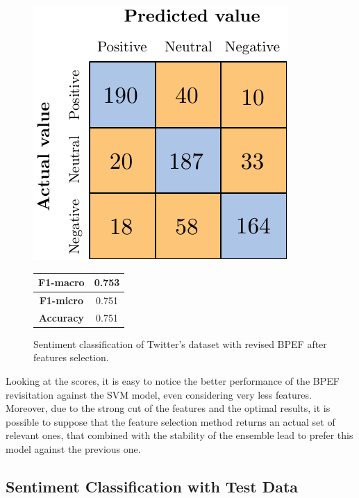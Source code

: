 \begin{figure}[H]
	\begin{minipage}[b]{0.6\linewidth}
		\centering
		\includegraphics[scale=1]{figures/conf_matrices/twitter_snt_bpef/twitter_snt_bpef_afs.pdf}
	\end{minipage}
	\begin{minipage}[b]{0.3\linewidth}
		\begin{tabular}[b]{ | c | c | } 
			\hline
			\textbf{F1-macro} & 0.753 \\
			\hline
			\textbf{F1-micro} & 0.751 \\ 
			\hline
			\textbf{Accuracy} & 0.751 \\ 
			\hline
		\end{tabular}
	\end{minipage}
	\caption{Sentiment classification of Twitter's dataset with revised BPEF after features selection.}
	\label{fig:tw_snt_bpef_afs}
\end{figure}

Looking at the scores, it is easy to notice the better performance of the BPEF revisitation against the SVM model, even considering very less features. Moreover, due to the strong cut of the features and the optimal results, it is possible to suppose that the feature selection method returns an actual set of relevant ones, that combined with the stability of the ensemble lead to prefer this model against the previous one.


\subsection{Sentiment Classification with Test Data}

